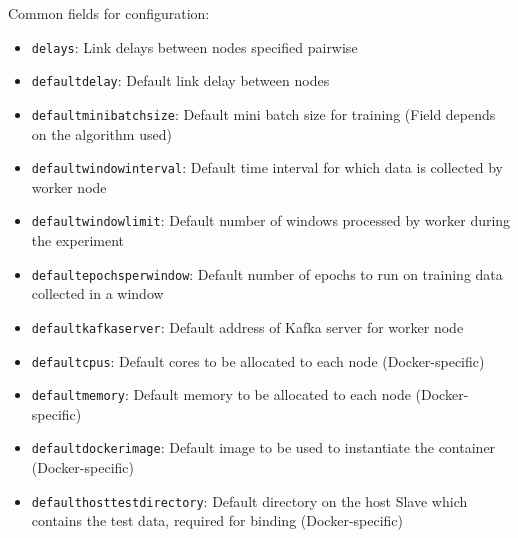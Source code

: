 \documentclass[a4paper, 12pt]{article}
\begin{document}
Common fields for configuration:
\begin{itemize}
    \item \texttt{delays}: Link delays between nodes specified pairwise
    \item \texttt{default\textunderscore delay}: Default link delay between nodes
    \item \texttt{default\textunderscore mini\textunderscore batch\textunderscore size}: Default mini batch size for training (Field depends on the algorithm used)
    \item \texttt{default\textunderscore window\textunderscore interval}: Default time interval for which data is collected by worker node
    \item \texttt{default\textunderscore window\textunderscore limit}: Default number of windows processed by worker during the experiment
    \item \texttt{default\textunderscore epochs\textunderscore per\textunderscore window}: Default number of epochs to run on training data collected in a window 
    \item \texttt{default\textunderscore kafka\textunderscore server}: Default address of Kafka server for worker node
    \item \texttt{default\textunderscore cpus}: Default cores to be allocated to each node (Docker-specific)
    \item \texttt{default\textunderscore memory}: Default memory to be allocated to each node (Docker-specific)
    \item \texttt{default\textunderscore docker\textunderscore image}: Default image to be used to instantiate the container (Docker-specific)
    \item \texttt{default\textunderscore host\textunderscore test\textunderscore directory}: Default directory on the host Slave which contains the test data, required for binding (Docker-specific)
\end{itemize}
\end{document}
